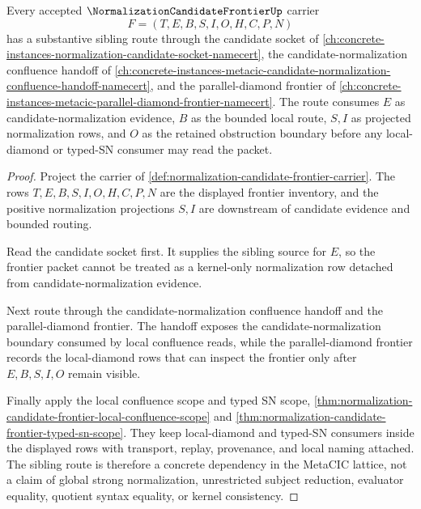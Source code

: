 \begin{theorem}
\label{thm:normalization-candidate-frontier-sibling-route}
Every accepted $\NormalizationCandidateFrontierUp$ carrier
$$
F=(T,E,B,S,I,O,H,C,P,N)
$$
has a substantive sibling route through the candidate socket of \autoref{ch:concrete-instances-normalization-candidate-socket-namecert}, the candidate-normalization confluence handoff of \autoref{ch:concrete-instances-metacic-candidate-normalization-confluence-handoff-namecert}, and the parallel-diamond frontier of \autoref{ch:concrete-instances-metacic-parallel-diamond-frontier-namecert}. The route consumes $E$ as candidate-normalization evidence, $B$ as the bounded local route, $S,I$ as projected normalization rows, and $O$ as the retained obstruction boundary before any local-diamond or typed-SN consumer may read the packet.
\end{theorem}
\begin{proof}
Project the carrier of \autoref{def:normalization-candidate-frontier-carrier}. The rows $T,E,B,S,I,O,H,C,P,N$ are the displayed frontier inventory, and the positive normalization projections $S,I$ are downstream of candidate evidence and bounded routing.

Read the candidate socket first. It supplies the sibling source for $E$, so the frontier packet cannot be treated as a kernel-only normalization row detached from candidate-normalization evidence.

Next route through the candidate-normalization confluence handoff and the parallel-diamond frontier. The handoff exposes the candidate-normalization boundary consumed by local confluence reads, while the parallel-diamond frontier records the local-diamond rows that can inspect the frontier only after $E,B,S,I,O$ remain visible.

Finally apply the local confluence scope and typed SN scope, \autoref{thm:normalization-candidate-frontier-local-confluence-scope} and \autoref{thm:normalization-candidate-frontier-typed-sn-scope}. They keep local-diamond and typed-SN consumers inside the displayed rows with transport, replay, provenance, and local naming attached. The sibling route is therefore a concrete dependency in the MetaCIC lattice, not a claim of global strong normalization, unrestricted subject reduction, evaluator equality, quotient syntax equality, or kernel consistency.
\end{proof}
